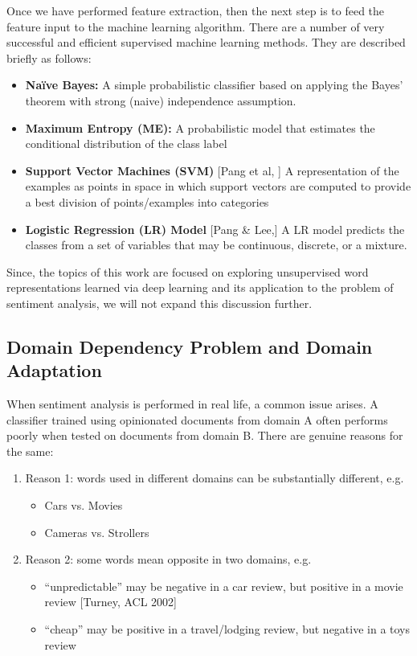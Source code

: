 Once we have performed feature extraction, then the next step is to feed the feature input to the machine learning algorithm. There are a number of very successful and efficient supervised machine learning methods. They are described briefly as follows:
\begin{itemize}
\item \textbf{Na\"{i}ve Bayes:} A simple probabilistic classifier based on applying the Bayes' theorem with strong (naive) independence assumption.
\item \textbf{Maximum Entropy (ME):}  A probabilistic model that estimates the conditional distribution of the class label
\item \textbf{Support Vector Machines (SVM)} [Pang et al, \parencite{ch1:pang}] A representation of the examples as points in space in which support vectors are computed to provide a best division of points/examples into categories
\item \textbf{Logistic Regression (LR) Model} [Pang \& Lee,\parencite{ch2:panglee}] A LR model predicts the classes from a set of variables that may be continuous, discrete, or a mixture.
\end{itemize}

Since, the topics of this work are focused on exploring unsupervised word representations learned via deep learning and its application to the problem of sentiment analysis, we will not expand this discussion further.

\subsection{Domain Dependency Problem and Domain Adaptation}
When sentiment analysis is performed in real life, a common issue arises. A classifier trained using opinionated documents from domain A often performs poorly when tested on documents from domain B. There are genuine reasons for the same:
\begin{enumerate}
\item Reason 1: words used in different domains can be substantially different, e.g.
\begin{itemize}
\item Cars vs. Movies
\item Cameras vs. Strollers
\end{itemize}
\item Reason 2: some words mean opposite in two domains, e.g.
\begin{itemize}
\item “unpredictable” may be negative in a car review, but positive in a movie review [Turney, ACL 2002]
\item “cheap” may be positive in a travel/lodging review, but negative in a toys review
\end{itemize}
\end{enumerate}

